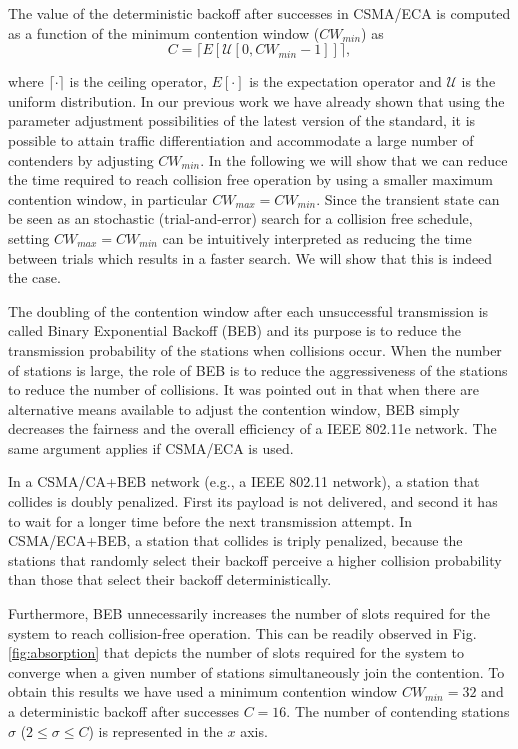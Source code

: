 \documentclass[journal]{IEEEtran}
\begin{document}
The value of the deterministic backoff after successes in CSMA/ECA is computed as a function of the minimum contention window ($CW_{min}$) as
\begin{equation}
C = \lceil E \left[ \mathcal{U} [0,CW_{min} - 1 ] \right] \rceil,
\label{eq:deterministic_backoff}
\end{equation}

where $\lceil \cdot \rceil$ is the ceiling operator, $E \left[ \cdot \right]$ is the expectation operator and $\mathcal{U}$ is the uniform distribution. In our previous work we have already shown that using the parameter adjustment possibilities of the latest version of the standard, it is possible to attain traffic differentiation \cite{barcelo2009tpc} and accommodate a large number of contenders \cite{barcelo2010dpa} by adjusting $CW_{min}$.
In the following we will show that we can reduce the time required to reach collision free operation by using a smaller maximum contention window, in particular $CW_{max}=CW_{min}$. 
Since the transient state can be seen as an stochastic (trial-and-error) search for a collision free schedule, setting $CW_{max} = CW_{min}$ can be intuitively interpreted as reducing the time between trials which results in a faster search. We will show that this is indeed the case.

The doubling of the contention window after each unsuccessful transmission is called Binary Exponential Backoff (BEB) and its purpose is to reduce the transmission probability of the stations when collisions occur. When the number of stations is large, the role of BEB is to reduce the aggressiveness of the stations to reduce the number of collisions. It was pointed out in \cite{banchs2006tao} that when there are alternative means available to adjust the contention window, BEB simply decreases the fairness and the overall efficiency of a IEEE 802.11e network. The same argument applies if CSMA/ECA is used.

In a CSMA/CA+BEB network (e.g., a IEEE 802.11 network), a station that collides is doubly penalized. First its payload is not delivered, and second it has to wait for a longer time before the next transmission attempt. In CSMA/ECA+BEB, a station that collides is triply penalized, because the stations that randomly select their backoff perceive a higher collision probability than those that select their backoff deterministically.

Furthermore, BEB unnecessarily increases the number of slots required for the system to reach collision-free operation. This can be readily observed in Fig. \ref{fig:absorption} that depicts the number of slots required for the system to converge when a given number of stations simultaneously join the contention. To obtain this results we have used a minimum contention window $CW_{min}=32$ and a deterministic backoff after successes $C=16$. The number of contending stations $\sigma$ ($2\leq \sigma \leq C$) is represented in the $x$ axis. 
\end{document}
